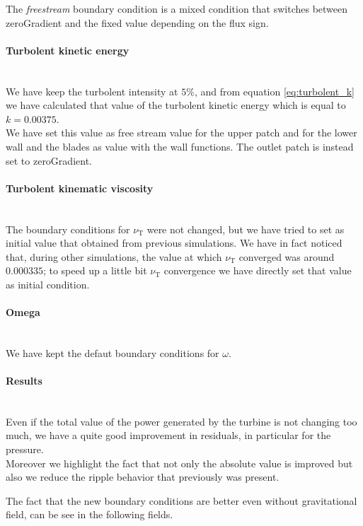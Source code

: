 \documentclass[a4paper,12pt]{article}
\newcommand{\nut}{\nu_\text{T}}
\begin{document}
The \emph{freestream} boundary condition is a mixed condition that switches between zeroGradient and the fixed value depending on the flux sign.

\paragraph{Turbolent kinetic energy}\mbox{}\\
We have keep the turbolent intensity at $5\%$, and from equation \ref{eq:turbolent_k} we have calculated that value of the turbolent kinetic energy which is equal to $k = 0.00375$.\\
We have set this value as free stream value for the upper patch and for the lower wall and the blades as value with the wall functions.
The outlet patch is instead set to zeroGradient.

\paragraph{Turbolent kinematic viscosity}\mbox{}\\
The boundary conditions for $\nut$ were not changed, but we have tried to set as initial value that obtained from previous simulations. We have in fact noticed that, during other simulations, the value at which $\nut$ converged was around $0.000335$; to speed up a little bit $\nut$ convergence we have directly set that value as initial condition.

\paragraph{Omega}\mbox{}\\
We have kept the defaut boundary conditions for $\omega$.

\paragraph{Results}\mbox{}\\
Even if the total value of the power generated by the turbine is not changing too much, we have a quite good improvement in residuals, in particular for the pressure.
\\Moreover we highlight the fact that not only the absolute value is improved but also we reduce the ripple behavior that previously was present.

The fact that the new boundary conditions are better even without gravitational field, can be see in the following fields.
\end{document}
